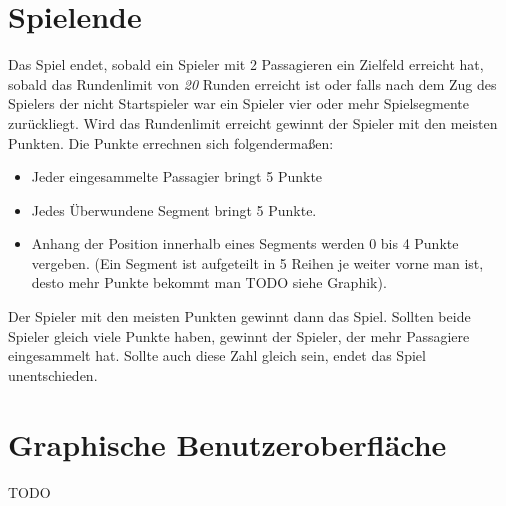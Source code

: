 \documentclass[12pt,a4paper, ngerman, oneside]{scrartcl}
\newcommand{\Rundenlimit}{\emph{20}}
\begin{document}
\section{Spielende}
Das Spiel endet, sobald ein Spieler mit 2 Passagieren ein Zielfeld erreicht hat, sobald das Rundenlimit von \emph{\Rundenlimit} Runden erreicht ist oder falls nach dem Zug des Spielers der nicht Startspieler war ein Spieler vier oder mehr Spielsegmente zurückliegt. Wird das Rundenlimit erreicht gewinnt der Spieler mit den meisten Punkten. Die Punkte errechnen sich folgendermaßen:
\begin{itemize}
\item Jeder eingesammelte Passagier bringt 5 Punkte
\item Jedes Überwundene Segment bringt 5 Punkte. 
\item Anhang der Position innerhalb eines Segments werden 0 bis 4 Punkte vergeben. (Ein Segment ist aufgeteilt in 5 Reihen je weiter vorne man ist, desto mehr Punkte bekommt man TODO siehe Graphik).
\end{itemize}
Der Spieler mit den meisten Punkten gewinnt dann das Spiel. Sollten beide Spieler gleich viele Punkte haben, gewinnt der Spieler, der mehr Passagiere eingesammelt hat. Sollte auch diese Zahl gleich sein, endet das Spiel unentschieden.
\section{Graphische Benutzeroberfläche}
TODO
\end{document}
